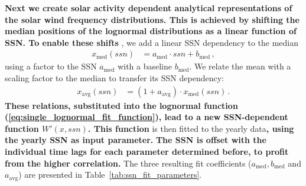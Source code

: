 \textbf{Next we create solar activity dependent analytical representations of the solar wind frequency distributions. This is achieved by shifting the median positions of the lognormal distributions as a linear function of SSN. To enable these shifts }, we add a linear SSN dependency to the median
\begin{align}
	x_\text{med}(ssn) &= a_\text{med} \cdot ssn + b_\text{med}\,,	\label{eq:median_with_ssn}
\end{align}
using a factor to the SSN $a_\text{med}$ with a baseline $b_\text{med}$. We relate the mean with a scaling factor to the median to transfer its SSN dependency:
\begin{align}
	x_\text{avg}(ssn) &= (1 + a_\text{avg}) \cdot x_\text{med}(ssn)\,.	\label{eq:mean_with_ssn}
\end{align}
\textbf{These relations, substituted into the lognormal function (\ref{eq:single_lognormal_fit_function}), lead to a new SSN-dependent function $W'(x,ssn)$. This function} is then fitted to the yearly data\textbf{, using the yearly SSN as input parameter.} \textbf{The SSN is offset with the individual time lags for each parameter determined before, to profit from the higher correlation.} The three resulting fit coefficients ($a_\text{med}, b_\text{med}$ and $a_\text{avg}$) are presented in Table~\ref{tab:ssn_fit_parameters}.
